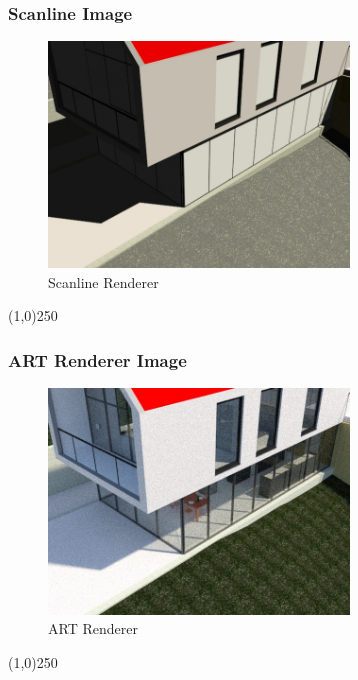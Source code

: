 \begin{frame}
\frametitle{Scanline Image}
\begin{figure}
	\centering
		\includegraphics[height=6cm]{img/RenderEngine/Revit3DSScanLine.jpg}
	\caption{Scanline Renderer}
	\label{fig:Scanline}
\end{figure}
\end{frame}
\begin{center}\line(1,0){250}\end{center}


\begin{frame}
\frametitle{ART Renderer Image}
\begin{figure}
	\centering
	\includegraphics[height=6cm]{img/RenderEngine/Revit3DSARTRenderer.jpg}
	\caption{ART Renderer}
	\label{fig:ARTRenderer}
\end{figure}
\end{frame}
\begin{center}\line(1,0){250}\end{center}






